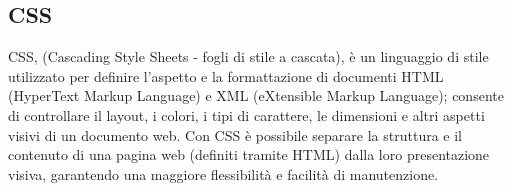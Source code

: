\subsection{CSS} 
CSS, (Cascading Style Sheets - fogli di stile a cascata), è un linguaggio di stile utilizzato per definire l'aspetto e la formattazione di documenti HTML (HyperText Markup Language) e XML (eXtensible Markup Language); consente di controllare il layout, i colori, i tipi di carattere, le dimensioni e altri aspetti visivi di un documento web. Con CSS è possibile separare la struttura e il contenuto di una pagina web (definiti tramite HTML) dalla loro presentazione visiva, garantendo una maggiore flessibilità e facilità di manutenzione.
